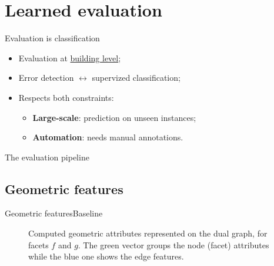 \documentclass[10pt]{beamer}
\begin{document}
    \section{Learned evaluation}
        \begin{frame}{Evaluation is classification}
            \begin{itemize}[label=$\blacktriangleright$, font=\color{IGNGreen}]
                \item<1-> Evaluation at \underline{building level};
                \item<2-> Error detection \(\leftrightarrow\) supervized classification;
                \item<3-> Respects both constraints:
                    \begin{itemize}[label=$\blacktriangleright$, font=\color{IGNGreen}]
                        \item<4-> \textbf{Large-scale}: prediction on unseen instances;
                        \item<5-> \textbf{Automation}: needs manual annotations.
                    \end{itemize}
            \end{itemize}
        \end{frame}

        \begin{frame}{The evaluation pipeline}
            \begin{figure}[H]
                
            \end{figure}
        \end{frame}

        \subsection{Geometric features}
            \begin{frame}{Geometric features}{Baseline}
                \begin{figure}[H]
                    \centering
                    
                    \caption[
                        Computed geometric attributes represented on the dual graph, for facets \(f\) and \(g\).
                    ]{
                        \label{fig::geometric_features}
                        Computed geometric attributes represented on the dual graph, for facets \(f\) and \(g\).
                        The green vector groups the node (facet) attributes while the blue one shows the edge features.
                    }
                \end{figure}
            \end{frame}
\end{document}
